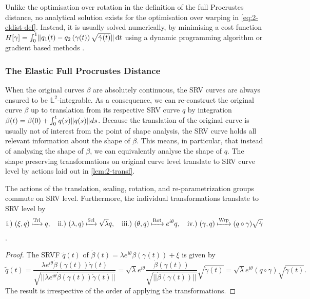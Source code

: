 \noindent Unlike the optimisation over rotation in the definition of the full Procrustes distance, no analytical solution exists for the optimisation over warping in \cref{eq:2-eldist-def}.
Instead, it is usually solved numerically, by minimising a cost function $H[\gamma] = \int_0^1 \lVert q_1(t) - q_2\left( \gamma(t) \right) \sqrt{\dot\gamma(t)}\rVert \mathop{\mathrm{d}t}$ using a dynamic programming algorithm \parencite[see e.g.][152]{SrivastavaKlassen2016} or gradient based methods \parencite[see e.g.][]{Steyer2021}.


\subsubsection*{The Elastic Full Procrustes Distance}
When the original curves $\beta$ are absolutely continuous, the SRV curves are always ensured to be $\mathbb{L}^2$-integrable.
As a consequence, we can re-construct the original curve $\beta$ up to translation from its respective SRV curve $q$ by integration $\beta(t) = \beta(0) + \int_0^t q(s) \lVert q(s)\rVert ds$.
Because the translation of the original curve is usually not of interest from the point of shape analysis, the SRV curve holds all relevant information about the shape of $\beta$.
This means, in particular, that instead of analysing the shape of $\beta$, we can equivalently analyse the shape of $q$.
The shape preserving transformations on original curve level translate to SRV curve level by actions laid out in \cref{lem:2-transf}.

\begin{lemma}
  \label{lem:2-transf}
  The actions of the translation, scaling, rotation, and re-parametrization groups commute on SRV level.
  Furthermore, the individual transformations translate to SRV level by 
  \begin{equation*}
    \text{i.)} \,\,(\xi, q) \xmapsto{\text{Trl}} q,\quad 
    \text{ii.)} \,\, (\lambda, q) \xmapsto{\text{Scl}} \sqrt\lambda q,\quad
    \text{iii.)} \,\, (\theta, q) \xmapsto{\text{Rot}} e^{i\theta} q,\quad
    \text{iv.)} \,\, (\gamma, q) \xmapsto{\text{Wrp}} (q \circ \gamma) \sqrt{\dot\gamma}
  \end{equation*}
  \parencite[see e.g.][142]{SrivastavaKlassen2016}.
\begin{proof} The SRVF $\widetilde q(t)$ of  $\widetilde\beta(t) = \lambda e^{i\theta}\beta\left(\gamma(t)\right) + \xi$ is given by
$$ \widetilde q (t) 
  = \frac{\lambda e^{i\theta} \dot\beta\left(\gamma(t)\right) \dot\gamma(t)}{\sqrt{||\lambda e^{i\theta} \dot\beta\left(\gamma(t)\right) \dot\gamma(t)||}} 
  = \sqrt{\lambda} e^{i\theta} \frac{\dot\beta\left(\gamma(t)\right)}{\sqrt{||\dot\beta\left(\gamma(t)\right)||}} \sqrt{\dot\gamma(t)} 
  = \sqrt\lambda e^{i\theta} \left( q \circ \gamma \right) \sqrt{\dot\gamma(t)}.$$
The result is irrespective of the order of applying the transformations.
\end{proof}
\end{lemma}

